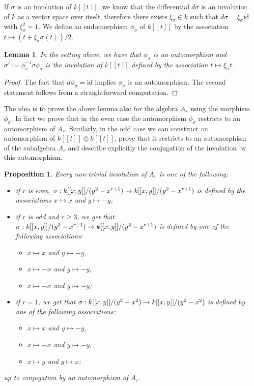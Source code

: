 \documentclass{alggeom}
\numberwithin{equation}{section}
\numberwithin{subsection}{section}
\newtheorem{proposition}[theorem]{Proposition}
\newtheorem{lemma}[theorem]{Lemma}
\theoremstyle{definition}
\theoremstyle{remark}
\newcommand\arr{\ifinner\to\else\longrightarrow\fi}
\newcommand\id{\mathrm{id}}
\begin{document}
If $\sigma$ is an involution of $k[[t]]$, we know that the differential $d\sigma$ is an involution of $k$ as a vector space over itself, therefore there exists $\xi_{\sigma} \in k$ such that $d\sigma=\xi_{\sigma} \id$ with $\xi_{\sigma}^2=1$.
We define an endomorphism $\phi_{\sigma}$ of $k[[t]]$ by the association $t\mapsto (t+\xi_{\sigma}\sigma(t))/2$. 

\begin{lemma}
	In the setting above, we have that $\phi_{\sigma}$ is an automorphism and $\sigma':=\phi_{\sigma}^{-1}\sigma\phi_{\sigma}$ is the involution of $k[[t]]$ defined by the association $t\mapsto \xi_{\sigma} t$.
\end{lemma}
\begin{proof}
	The fact that $d\phi_{\sigma}=\id$ implies $\phi_{\sigma}$ is an automorphism. The second statement follows from a straightforward computation.
\end{proof}

The idea is to prove the above lemma also for the algebra $A_r$ using the morphism $\phi_{\sigma}$. In fact we prove that in the even case the automorphism $\phi_{\sigma}$ restricts to an automorphism of $A_r$. Similarly, in the odd case we can construct an automorphism of $k[[t]]\oplus k[[t]]$, prove that it restricts to an automorphism of the subalgebra $A_r$ and describe explicitly the conjugation of the involution by this automorphism.

 
 \begin{proposition}\label{prop:descr-inv}
 	Every non-trivial involution of $A_r$ is one of the following: 
 	\begin{itemize}
 		\item[$(a)$] if $r$ is even, $\sigma:k[[x,y]]/(y^2-x^{r+1}) \arr k[[x,y]]/(y^2-x^{r+1})$ is defined by the associations $x\mapsto x$ and $y\mapsto -y$;	
 		\item[$(b)$] if $r$ is odd and $r\geq 3$, we get that $\sigma:k[[x,y]]/(y^2-x^{r+1}) \arr k[[x,y]]/(y^2-x^{r+1})$ is defined by one of the following associations:
 		\begin{itemize}
 			\item[$(b_1)$] $x\mapsto x$ and $ y \mapsto -y$,
 			\item[$(b_2)$] $x\mapsto -x$ and $y \mapsto -y$,
 			\item[$(b_3)$] $x\mapsto -x$ and $y \mapsto -y$;
 		\end{itemize}
 		\item[$(c)$] if $r=1$, we get that $\sigma:k[[x,y]]/(y^2-x^2) \arr k[[x,y]]/(y^2-x^2)$ is defined by one of the following associations: 
 		\begin{itemize}
 			\item[$(c_1)$] $x\mapsto x$ and $y\mapsto -y$,
 			\item[$(c_2)$] $x\mapsto -x$ and $y\mapsto -y$,
 			\item[$(c_3)$] $x\mapsto y$ and $y\mapsto x$;
 		\end{itemize}
 	\end{itemize}
 up to conjugation by an automorphism of $A_r$. 
\end{proposition}  
\end{document}
